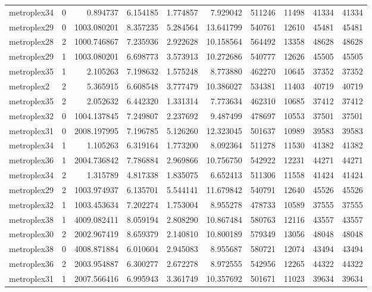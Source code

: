 \begin{longtable}{|l|r|r|r|r|r|r|r|r|r|}
metroplex34 & 0 & 0.894737 & 6.154185 & 1.774857 & 7.929042 & 511246 & 11498 & 41334 & 41334 \\
metroplex29 & 0 & 1003.080201 & 8.357235 & 5.284564 & 13.641799 & 540761 & 12610 & 45481 & 45481 \\
metroplex28 & 2 & 1000.746867 & 7.235936 & 2.922628 & 10.158564 & 564492 & 13358 & 48628 & 48628 \\
metroplex29 & 1 & 1003.080201 & 6.698773 & 3.573913 & 10.272686 & 540777 & 12626 & 45505 & 45505 \\
metroplex35 & 1 & 2.105263 & 7.198632 & 1.575248 & 8.773880 & 462270 & 10645 & 37352 & 37352 \\
metroplex2 & 2 & 5.365915 & 6.608548 & 3.777479 & 10.386027 & 534381 & 11403 & 40719 & 40719 \\
metroplex35 & 2 & 2.052632 & 6.442320 & 1.331314 & 7.773634 & 462310 & 10685 & 37412 & 37412 \\
metroplex32 & 0 & 1004.137845 & 7.249807 & 2.237692 & 9.487499 & 478697 & 10553 & 37501 & 37501 \\
metroplex31 & 0 & 2008.197995 & 7.196785 & 5.126260 & 12.323045 & 501637 & 10989 & 39583 & 39583 \\
metroplex34 & 1 & 1.105263 & 6.319164 & 1.773200 & 8.092364 & 511278 & 11530 & 41382 & 41382 \\
metroplex36 & 1 & 2004.736842 & 7.786884 & 2.969866 & 10.756750 & 542922 & 12231 & 44271 & 44271 \\
metroplex34 & 2 & 1.315789 & 4.817338 & 1.835075 & 6.652413 & 511306 & 11558 & 41424 & 41424 \\
metroplex29 & 2 & 1003.974937 & 6.135701 & 5.544141 & 11.679842 & 540791 & 12640 & 45526 & 45526 \\
metroplex32 & 1 & 1003.453634 & 7.202274 & 1.753004 & 8.955278 & 478733 & 10589 & 37555 & 37555 \\
metroplex38 & 1 & 4009.082411 & 8.059194 & 2.808290 & 10.867484 & 580763 & 12116 & 43557 & 43557 \\
metroplex30 & 2 & 2002.967419 & 8.659379 & 2.140810 & 10.800189 & 579349 & 13056 & 48048 & 48048 \\
metroplex38 & 0 & 4008.871884 & 6.010604 & 2.945083 & 8.955687 & 580721 & 12074 & 43494 & 43494 \\
metroplex36 & 2 & 2003.954887 & 6.300277 & 2.672278 & 8.972555 & 542956 & 12265 & 44322 & 44322 \\
metroplex31 & 1 & 2007.566416 & 6.995943 & 3.361749 & 10.357692 & 501671 & 11023 & 39634 & 39634 \\

\end{longtable}
